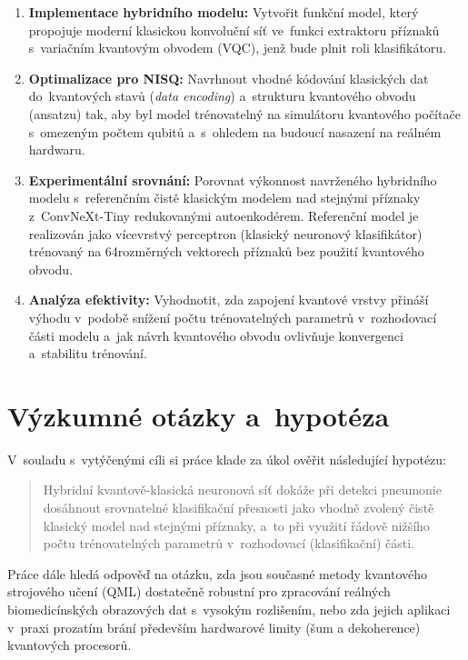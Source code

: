 \documentclass[12pt, a4paper]{report}
\begin{document}
\begin{enumerate}
  \item \textbf{Implementace hybridního modelu:}
  Vytvořit funkční model, který propojuje moderní klasickou konvoluční síť
  ve~funkci extraktoru příznaků s~variačním kvantovým obvodem (VQC),
  jenž bude plnit roli klasifikátoru.

  \item \textbf{Optimalizace pro NISQ:}
  Navrhnout vhodné kódování klasických dat do~kvantových stavů
  (\emph{data encoding}) a~strukturu kvantového obvodu (ansatzu) tak, aby byl
  model trénovatelný na simulátoru kvantového počítače
  s~omezeným počtem qubitů a~s~ohledem na budoucí nasazení na reálném hardwaru.

  \item \textbf{Experimentální srovnání:}
  Porovnat výkonnost navrženého hybridního modelu s~referenčním čistě
  klasickým modelem nad stejnými příznaky z~ConvNeXt-Tiny redukovanými autoenkodérem.
  Referenční model je realizován jako vícevrstvý perceptron (klasický
  neuronový klasifikátor) trénovaný na 64rozměrných vektorech příznaků
  bez použití kvantového obvodu.

  \item \textbf{Analýza efektivity:}
  Vyhodnotit, zda zapojení kvantové vrstvy přináší výhodu v~podobě snížení
  počtu trénovatelných parametrů v~rozhodovací části modelu a~jak návrh
  kvantového obvodu ovlivňuje konvergenci a~stabilitu trénování.
\end{enumerate}

\section*{Výzkumné otázky a~hypotéza}

V~souladu s~vytýčenými cíli si práce klade za úkol ověřit následující
hypotézu:

\begin{quote}
Hybridní kvantově-klasická neuronová síť dokáže při detekci pneumonie
dosáhnout srovnatelné klasifikační přesnosti jako vhodně zvolený čistě
klasický model nad stejnými příznaky, a~to při využití řádově nižšího počtu
trénovatelných parametrů v~rozhodovací (klasifikační) části.
\end{quote}

Práce dále hledá odpověď na otázku, zda jsou současné metody kvantového
strojového učení (QML) dostatečně robustní pro zpracování reálných
biomedicínských obrazových dat s~vysokým rozlišením, nebo zda jejich
aplikaci v~praxi prozatím brání především hardwarové limity (šum a
dekoherence) kvantových procesorů.
\end{document}
